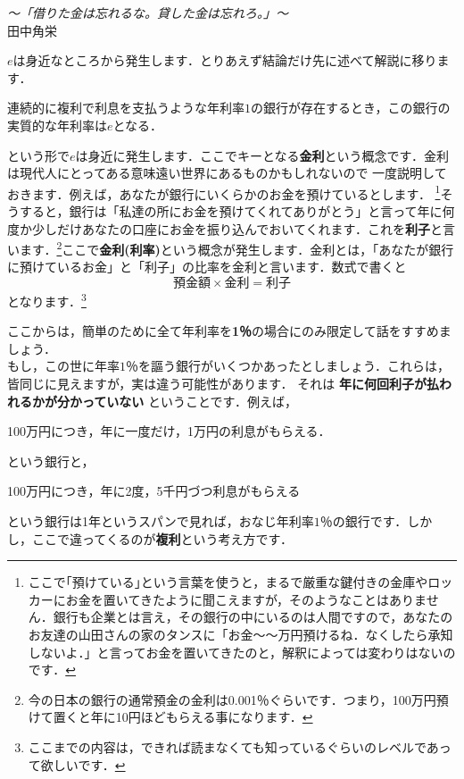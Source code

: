 \begin{flushright}
\textit {〜「借りた金は忘れるな。貸した金は忘れろ。」〜}\\
田中角栄
\end{flushright}

$e$は身近なところから発生します．とりあえず結論だけ先に述べて解説に移ります．
\begin{center}
連続的に複利で利息を支払うような年利率$1$の銀行が存在するとき，この銀行の実質的な年利率は$e$となる．
\end{center}
という形で$e$は身近に発生します．ここでキーとなる\textbf{金利}という概念です．金利は現代人にとってある意味遠い世界にあるものかもしれないので
一度説明しておきます．例えば，あなたが銀行にいくらかのお金を預けているとします．
\footnote{ここで｢預けている｣という言葉を使うと，まるで厳重な鍵付きの金庫やロッカーにお金を置いてきたように聞こえますが，そのようなことはありません．銀行も企業とは言え，その銀行の中にいるのは人間ですので，あなたのお友達の山田さんの家のタンスに「お金〜〜万円預けるね．なくしたら承知しないよ．」と言ってお金を置いてきたのと，解釈によっては変わりはないのです．}そうすると，銀行は「私達の所にお金を預けてくれてありがとう」と言って年に何度か少しだけあなたの口座にお金を振り込んでおいてくれます．これを\textbf{利子}と言います．\footnote{今の日本の銀行の通常預金の金利は0.001％ぐらいです．つまり，100万円預けて置くと年に10円ほどもらえる事になります．}ここで\textbf{金利(利率)}という概念が発生します．金利とは，「あなたが銀行に預けているお金」と「利子」の比率を金利と言います．数式で書くと
\[
\mbox{預金額}\times\mbox{金利} = \mbox{利子}
\]
となります．\footnote{ここまでの内容は，できれば読まなくても知っているぐらいのレベルであって欲しいです．}

ここからは，簡単のために全て年利率を\textbf{1％}の場合にのみ限定して話をすすめましょう．\\
もし，この世に年率$1$％を謳う銀行がいくつかあったとしましょう．これらは，皆同じに見えますが，実は違う可能性があります．
それは \textbf{年に何回利子が払われるかが分かっていない} ということです．例えば，
\begin{center}
100万円につき，年に一度だけ，1万円の利息がもらえる．
\end{center}
という銀行と，
\begin{center}
100万円につき，年に2度，5千円づつ利息がもらえる
\end{center}
という銀行は1年というスパンで見れば，おなじ年利率$1$％の銀行です．しかし，ここで違ってくるのが\textbf{複利}という考え方です．

